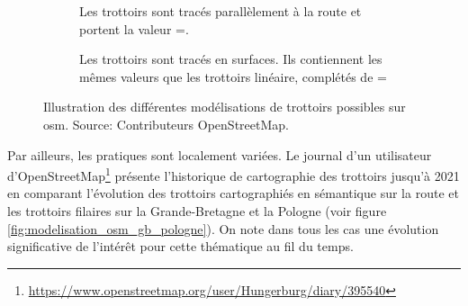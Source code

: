 \begin{figure}
\begin{subfigure}[t]{.32\linewidth}
        \caption{Les trottoirs sont tracés parallèlement à la route et portent la valeur =.}
    \end{subfigure}
    \begin{subfigure}[t]{.32\linewidth}
        \caption{Les trottoirs sont tracés en surfaces. Ils contiennent les mêmes valeurs que les trottoirs linéaire, complétés de =}
    \end{subfigure}
    \caption{Illustration des différentes modélisations de trottoirs possibles sur \gls{osm}. Source: Contributeurs OpenStreetMap.}
    \label{fig:modelisation_trottoir_osm}
\end{figure}

\newpar{}


Par ailleurs, les pratiques sont localement variées. Le journal d'un utilisateur d'OpenStreetMap\footnote{\url{https://www.openstreetmap.org/user/Hungerburg/diary/395540}} présente l'historique de cartographie des trottoirs jusqu'à 2021 en comparant l'évolution des trottoirs cartographiés en sémantique sur la route et les trottoirs filaires sur la Grande-Bretagne et la Pologne (voir figure \ref{fig:modelisation_osm_gb_pologne}). On note dans tous les cas une évolution significative de l'intérêt pour cette thématique au fil du temps.

